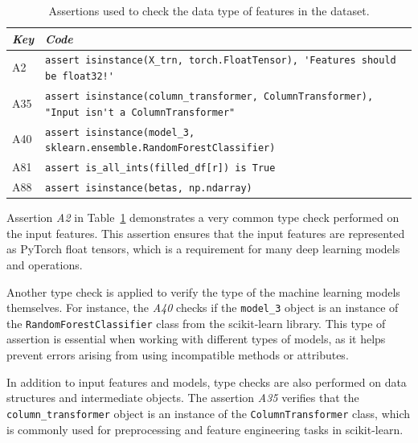 \begin{table}
  \centering
  \caption{Assertions used to check the data type of features in the dataset.}
  \begin{tabular}{@{}m{} m{}@{}}
    \toprule
    \emph{\textbf{Key}}&
    \emph{\textbf{Code}}\\
    \midrule

    A2 &
    \lstinline[]$assert isinstance(X_trn, torch.FloatTensor), 'Features should be float32!'$\\

    A35 &
    \lstinline[]$assert isinstance(column_transformer, ColumnTransformer), "Input isn't a ColumnTransformer"$\\

    A40 &
    \lstinline[]$assert isinstance(model_3, sklearn.ensemble.RandomForestClassifier)$\\

    A81 &
    \lstinline[]$assert is_all_ints(filled_df[r]) is True$\\

    A88 &
    \lstinline[]$assert isinstance(betas, np.ndarray)$\\
    \bottomrule
  \end{tabular}
  \label{tab:assert-type-check}
\end{table}

Assertion \emph{A2} in Table~\ref{tab:assert-type-check} demonstrates a very common type check performed on the input features. This assertion ensures that the input features are represented as PyTorch float tensors, which is a requirement for many deep learning models and operations.

Another type check is applied to verify the type of the machine learning models themselves. For instance, the \emph{A40} checks if the \lstinline{model_3} object is an instance of the \lstinline{RandomForestClassifier} class from the scikit-learn library. This type of assertion is essential when working with different types of models, as it helps prevent errors arising from using incompatible methods or attributes.

In addition to input features and models, type checks are also performed on data structures and intermediate objects. The assertion \emph{A35} verifies that the \lstinline{column_transformer} object is an instance of the \lstinline{ColumnTransformer} class, which is commonly used for preprocessing and feature engineering tasks in scikit-learn.

